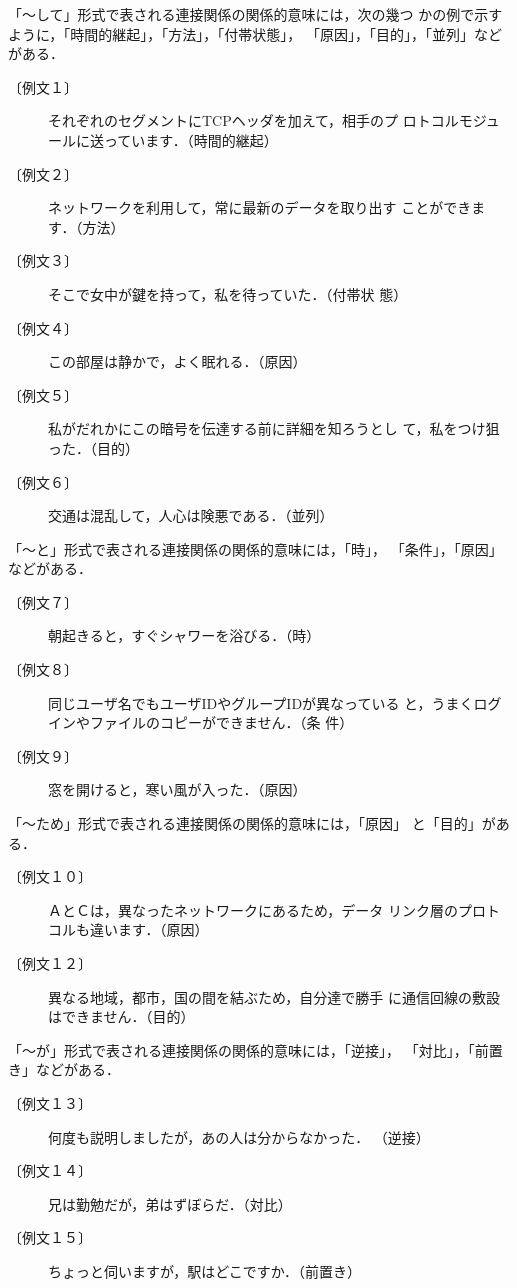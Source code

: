 「〜して」形式で表される連接関係の関係的意味には，次の幾つ
かの例で示すように，「時間的継起」，「方法」，「付帯状態」，
「原因」，「目的」，「並列」などがある．
\begin{description}
\item[〔例文１〕] それぞれのセグメントにTCPヘッダを加えて，相手のプ
ロトコルモジュールに送っています．（時間的継起）
\item[〔例文２〕] ネットワークを利用して，常に最新のデータを取り出す
ことができます．（方法）
\item[〔例文３〕] そこで女中が鍵を持って，私を待っていた．（付帯状
態）
\item[〔例文４〕] この部屋は静かで，よく眠れる．（原因）
\item[〔例文５〕] 私がだれかにこの暗号を伝達する前に詳細を知ろうとし
て，私をつけ狙った．（目的）
\item[〔例文６〕]交通は混乱して，人心は険悪である．（並列）
\end{description}

「〜と」形式で表される連接関係の関係的意味には，「時」，
「条件」，「原因」などがある．

\begin{description}
\item[〔例文７〕] 朝起きると，すぐシャワーを浴びる．（時）
\item[〔例文８〕] 同じユーザ名でもユーザIDやグループIDが異なっている
と，うまくログインやファイルのコピーができません．（条
件）
\item[〔例文９〕] 窓を開けると，寒い風が入った．（原因）
\end{description}

「〜ため」形式で表される連接関係の関係的意味には，「原因」
と「目的」がある．

\begin{description}
\item[〔例文１０〕] ＡとＣは，異なったネットワークにあるため，データ
リンク層のプロトコルも違います．（原因）
\item[〔例文１２〕] 異なる地域，都市，国の間を結ぶため，自分達で勝手
に通信回線の敷設はできません．（目的）
\end{description}

「〜が」形式で表される連接関係の関係的意味には，「逆接」，
「対比」，「前置き」などがある．

\begin{description}
\item[〔例文１３〕] 何度も説明しましたが，あの人は分からなかった．
（逆接）
\item[〔例文１４〕] 兄は勤勉だが，弟はずぼらだ．（対比）
\item[〔例文１５〕] ちょっと伺いますが，駅はどこですか．（前置き）
\end{description}

